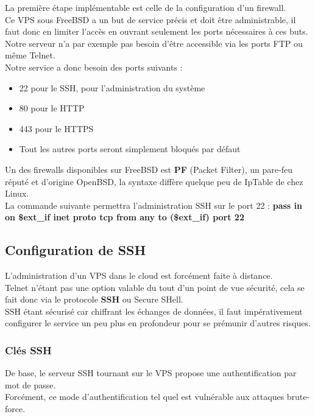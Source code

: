 \documentclass[a4paper,10pt,final,fleqn]{article}
\begin{document}
			La première étape implémentable est celle de la configuration d'un firewall.\\
			Ce VPS sous FreeBSD a un but de service précis et doit être administrable, il faut donc en limiter l'accès en ouvrant seulement les ports nécessaires à ces buts. Notre serveur n'a par exemple pas besoin d'être accessible via les ports FTP ou même Telnet.\\

			Notre service a donc besoin des ports suivants : \\
			\begin{itemize}
				\item 22 pour le SSH, pour l'administration du système
				\item 80 pour le HTTP
				\item 443 pour le HTTPS
				\item Tout les autres ports seront simplement bloqués par défaut
			\end{itemize}

			Un des firewalls disponibles sur FreeBSD est \textbf{PF} (Packet Filter), un pare-feu réputé et d'origine OpenBSD, la syntaxe diffère quelque peu de IpTable de chez Linux.\\

			La commande suivante permettra l'administration SSH sur le port 22 : \textbf{pass in on \$ext\_if inet proto tcp from any to (\$ext\_if) port 22}

		\subsection{Configuration de SSH}

			L'administration d'un VPS dans le cloud est forcément faite à distance.\\
			Telnet n'étant pas une option valable du tout d'un point de vue sécurité, cela se fait donc via le protocole \textbf{SSH} ou Secure SHell.\\

			SSH étant sécurisé car chiffrant les échanges de données, il faut impérativement configurer le service un peu plus en profondeur pour se prémunir d'autres risques.\\

			\subsubsection{Clés SSH}

				De base, le serveur SSH tournant sur le VPS propose une authentification par mot de passe.\\
				Forcément, ce mode d'authentification tel quel est vulnérable aux attaques brute-force.\\
\end{document}

